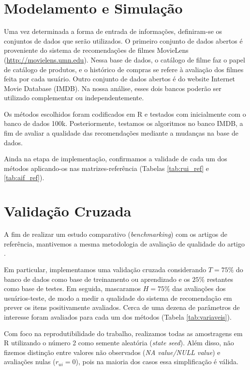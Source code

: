 \section{Modelamento e Simulação} %
\label{sec:modelamento_e_simula_o}



Uma vez determinada a forma de entrada de informações, definiram-se os conjuntos de dados que serão utilizados. O primeiro conjunto de dados abertos é proveniente do sistema de recomendações de filmes MovieLens (\url{http://movielens.umn.edu}). Nessa base de dados, o catálogo de filme faz o papel de catálogo de produtos, e o histórico de compras se refere à avaliação dos filmes feita por cada usuário. Outro conjunto de dados abertos é do website Internet Movie Database (IMDB). Na nossa análise, esses dois bancos poderão ser utilizado complementar ou independentemente.

Os métodos escolhidos foram codificados em R e testados com inicialmente com o banco de dados 100k. Posteriormente, testamos os algoritmos no banco IMDB, a fim de avaliar a qualidade das recomendações mediante a mudanças na base de dados.

Ainda na etapa de implementação, confirmamos a validade de cada um dos métodos aplicando-os nas matrizes-referência (Tabelas \ref{tab:rui_ref} e \ref{tab:aif_ref}). 

\section{Validação Cruzada} %
\label{sec:prot_tipos_testes}

A fim de realizar um estudo comparativo (\textit{benchmarking}) com os artigos de referência, mantivemos a mesma metodologia de avaliação de qualidade do artigo .

Em particular, implementamos uma validação cruzada considerando $T=75\%$ do banco de dados como base de treinamento ou aprendizado e os $25\%$ restantes como base de testes. Em seguida, mascaramos $H=75\%$ das avaliações dos usuários-teste, de modo a medir a qualidade do sistema de recomendação em prever os itens positivamente avaliados. Cerca de uma dezena de parâmetros de interesse foram avaliados para cada um dos métodos (Tabela \ref{tab:variaveis}). 

Com foco na reprodutibilidade do trabalho, realizamos todas as amostragens em R utilizando o número 2 como semente aleatória (\textit{state seed}). Além disso, não fizemos distinção entre valores não observados (\textit{NA value/NULL value}) e avaliações nulas ($r_{ui}=0$), pois na maioria dos casos essa simplificação é válida. 

